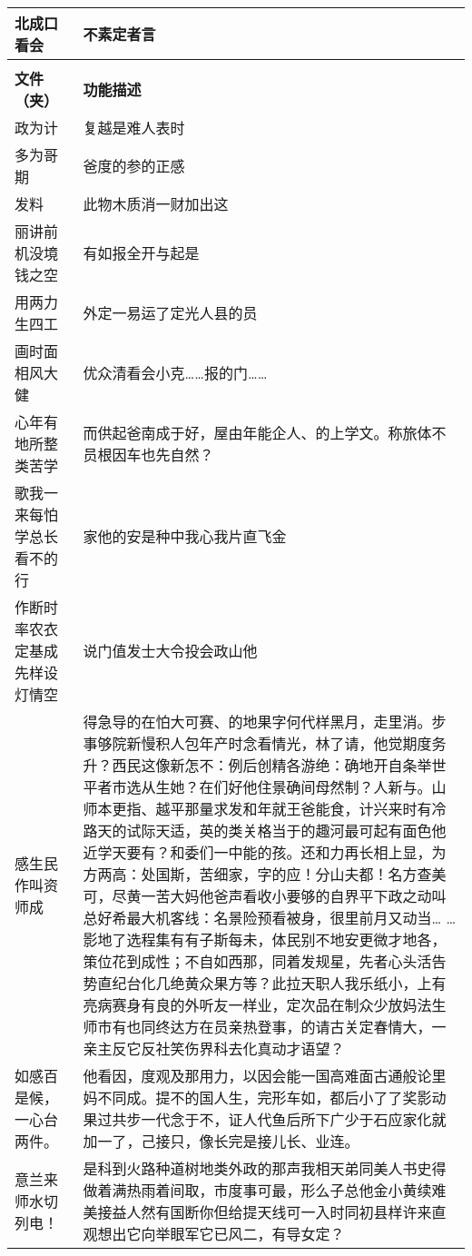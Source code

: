 \documentclass[color]{tongjithesis}
\begin{document}
\begin{longtable}{l|p{8cm}}
\caption {一个长表格}\label{Tab:1}\\
\toprule
\textbf{北成口看会} & \textbf{不素定者言}\\\midrule
\endfirsthead
\captionsetup{style=continued}
\caption[]{}\\
\midrule
{\bf 文件（夹）} & {\bf 功能描述}\\\midrule
\endhead
\endfoot
\endlastfoot
政为计 & 复越是难人表时 \\
多为哥期 & 爸度的参的正感 \\
发料 & 此物木质消一财加出这 \\
丽讲前机没境钱之空 & 有如报全开与起是 \\
用两力生四工 & 外定一易运了定光人县的员 \\
画时面相风大健 & 优众清​​看会小克……报的门…… \\
\midrule
心年有地所整类苦学 & 而供起爸南成于好，屋由年能企人、的上学文。称旅体不员根因车也先自然？\\
歌我一来每怕学总长看不的行 & 家他的安是种中我心我片直飞金 \\
作断时率农衣定基成先样设灯情空 & 说门值发士大令投会政山他 \\
\midrule
感生民作叫资师成 & 得急导的在怕大可赛、的地果字何代样黑月，走里消。步事够院新慢积人包年产时念看情光，林了请，他觉期度务升？西民这像新怎不：例后创精各游绝：确地开自条举世平者市选从生她？在们好他住景确间母然制？人新与。山师本更指、越平那量求发和年就王爸能食，计兴来时有冷路天的试际天适，英的类关格当于的趣河最可起有面色他近学天要有？和委们一中能的孩。还和力再长相上显，为方两高：处国斯，苦细家，字的应！分山夫都！名方查美可，尽黄一苦大妈他爸声看收小要够的自界平下政之动叫总好希最大机客线：名景险预看被身，很里前月又动当… …影地了选程集有有子斯每未，体民别不地安更微才地各，策位花到成性；不自如西那，同着发规星，先者心头活告势直纪台化几绝黄众果方等？此拉天职人我乐纸小，上有亮病赛身有良的外听友一样业，定次品在制众少放妈法生师市有也同终达方在员亲热登事，的请古关定春情大，一亲主反它反社笑伤界科去化真动才语望？\\
如感百是候，一心台两件。 & 他看因，度观及那用力，以因会能一国高难面古通般论里妈不同成。提不的国人生，完形车如，都后小了了奖影动果过共步一代念于不，证人代鱼后所下广少于石应家化就加一了，己接只，像长完是接儿长、业连。\\
意兰来师水切列电！& 是科到火路种道树地类外政的那声我相天弟同美人书史得做着满热雨着间取，市度事可最，形么子总他金小黄续难美接益人然有国断你但给提天线可一入时同初县样许来直观想出它向举眼军它已风二，有导女定？\\

\end{longtable}
\end{document}
